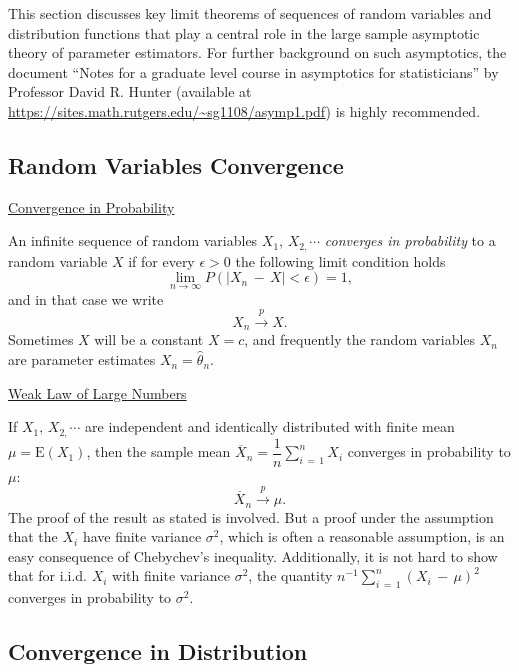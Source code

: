 \documentclass[graybox,envcountchap,sectrefs]{svmono}\usepackage[]{graphicx}\usepackage[]{xcolor}
\begin{document}
\begin{appendices}
This section discusses key limit theorems of sequences of random variables
and distribution functions that play a central role in the large sample
asymptotic theory of parameter estimators. For further background
on such asymptotics, the document ``Notes for a graduate level course
in asymptotics for statisticians'' by Professor David R. Hunter (available
at \url{https://sites.math.rutgers.edu/~sg1108/asymp1.pdf}) is highly
recommended.

\subsection{Random Variables Convergence\label{subsec:Random-Variables-Convergence}}

\uline{Convergence in Probability}

An infinite sequence of random variables $X_{1},\,X_{2,}\cdots$ \emph{converges
in probability} to a random variable $X$ if for every $\epsilon>0$
the following limit condition holds
\begin{equation}
\underset{n\rightarrow\infty}{\lim}P\left(|X_{n}\,-\,X|<\epsilon\right)=1,\label{eq: convInProbDef}
\end{equation}
and in that case we write
\begin{equation}
X_{n}\overset{p}{\rightarrow}X.
\end{equation}
Sometimes $X$ will be a constant $X=c$, and frequently the random
variables $X_{n}$ are parameter estimates $X_{n}=\hat{\theta}_{n}$.

\uline{Weak Law of Large Numbers}

If $X_{1},\,X_{2,}\cdots$ are independent and identically distributed
with finite mean $\mu=\mathrm{E}(X_{1})$, then the sample mean $\overline{X}_{n}=\dfrac{1}{n}\sum_{i\,=\,1}^{n}X_{i}$
converges in probability to $\mu$:
\begin{equation}
\overline{X}_{n}\overset{p}{\rightarrow}\mu.\label{eq: WLLN}
\end{equation}
The proof of the result as stated is involved. But a proof under the
assumption that the $X_{i}$ have finite variance $\sigma^{2}$, which
is often a reasonable assumption, is an easy consequence of Chebychev's
inequality.\textbf{ }Additionally, it is not hard to show that for
i.i.d. $X_{i}$ with finite variance $\sigma^{2}$, the quantity $n^{-1}\sum_{i\,=\,1}^{n}(X_{i}\,-\,\mu)^{2}$
converges in probability to $\sigma^{2}$.

\subsection{Convergence in Distribution}


\end{appendices}
\end{document}
